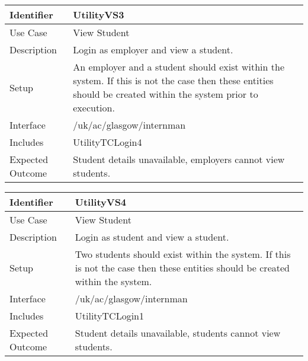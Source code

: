 \vspace{2em}

\begin{tabularx}{\textwidth}{|T|L|}
\hline
Identifier & UtilityVS3\\
\hline
Use Case & View Student \\
\hline
Description & Login as employer and view a student.\\
\hline
Setup & An employer and a student should exist within the system. If
this is not the case then these entities should be created within the
system prior to execution. \\
\hline
Interface & /uk/ac/glasgow/internman \\
\hline
Includes & UtilityTCLogin4\\
\hline
Expected Outcome & Student details unavailable, employers cannot view
students.\\
\hline
\end{tabularx}

\vspace{2em}

\begin{tabularx}{\textwidth}{|T|L|}
\hline
Identifier & UtilityVS4\\
\hline
Use Case & View Student \\
\hline 
Description & Login as student and view a student.\\
\hline
Setup & Two students should exist within the system. If this is not
the case then these entities should be created within the system. \\
\hline
Interface & /uk/ac/glasgow/internman \\
\hline
Includes & UtilityTCLogin1\\
\hline
Expected Outcome & Student details unavailable, students cannot view
students.\\
\hline
\end{tabularx}
